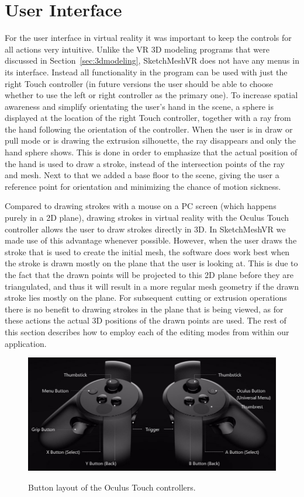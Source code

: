 \section{User Interface}
For the user interface in virtual reality it was important to keep the controls for all actions very intuitive. Unlike the VR 3D modeling programs that were discussed in Section~\ref{sec:3dmodeling}, SketchMeshVR does not have any menus in its interface. Instead all functionality in the program can be used with just the right Touch controller (in future versions the user should be able to choose whether to use the left or right controller as the primary one). To increase spatial awareness and simplify orientating the user's hand in the scene, a sphere is displayed at the location of the right Touch controller, together with a ray from the hand following the orientation of the controller. When the user is in draw or pull mode or is drawing the extrusion silhouette, the ray disappears and only the hand sphere shows. This is done in order to emphasize that the actual position of the hand is used to draw a stroke, instead of the intersection points of the ray and mesh. Next to that we added a base floor to the scene, giving the user a reference point for orientation and minimizing the chance of motion sickness.

Compared to drawing strokes with a mouse on a PC screen (which happens purely in a 2D plane), drawing strokes in virtual reality with the Oculus Touch controller allows the user to draw strokes directly in 3D. In SketchMeshVR we made use of this advantage whenever possible. However, when the user draws the stroke that is used to create the initial mesh, the software does work best when the stroke is drawn mostly on the plane that the user is looking at. This is due to the fact that the drawn points will be projected to this 2D plane before they are triangulated, and thus it will result in a more regular mesh geometry if the drawn stroke lies mostly on the plane. For subsequent cutting or extrusion operations there is no benefit to drawing strokes in the plane that is being viewed, as for these actions the actual 3D positions of the drawn points are used. The rest of this section describes how to employ each of the editing modes from within our application.

\begin{figure}[!h]
    \centering
    \includegraphics[width=0.7260\linewidth]{figures/touch_controllers}\\
    \caption[Oculus Touch controllers]{Button layout of the Oculus Touch controllers.
      \label{fig:touch_controller}}
\end{figure}

